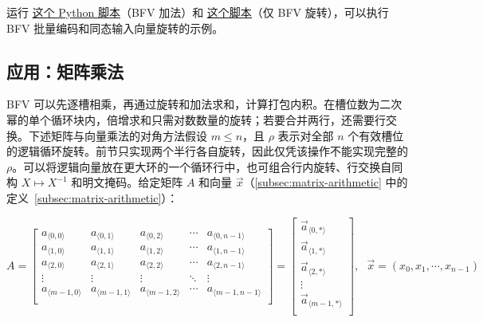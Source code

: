  运行 \href{https://github.com/wang2000star/fhe-textbook-cn/blob/chinese-edition/source%20code/bfv.py}{\underline{这个 Python 脚本}}（BFV 加法）和 \href{https://github.com/wang2000star/fhe-textbook-cn/blob/chinese-edition/source%20code/bfv_rotation_only.py}{\underline{这个脚本}}（仅 BFV 旋转），可以执行 BFV 批量编码和同态输入向量旋转的示例。



\subsection{应用：矩阵乘法}
\label{subsec:bfv-matrix-multiplication}

BFV 可以先逐槽相乘，再通过旋转和加法求和，计算打包内积。在槽位数为二次幂的单个循环块内，倍增求和只需对数数量的旋转；若要合并两行，还需要行交换。下述矩阵与向量乘法的对角方法假设 $m\leq n$，且 $\rho$ 表示对全部 $n$ 个有效槽位的逻辑循环旋转。前节只实现两个半行各自旋转，因此仅凭该操作不能实现完整的 $\rho$。可以将逻辑向量放在更大环的一个循环行中，也可组合行内旋转、行交换自同构 $X\mapsto X^{-1}$ 和明文掩码。给定矩阵 $A$ 和向量 $\vec x$（\autoref{subsec:matrix-arithmetic} 中的定义~\ref*{subsec:matrix-arithmetic}）：

$A = \begin{bmatrix}
 a_{\langle 0, 0\rangle} & a_{\langle 0, 1\rangle} & a_{\langle 0, 2\rangle} & \cdots & a_{\langle 0, n-1\rangle}\\
 a_{\langle 1, 0\rangle} & a_{\langle 1, 1\rangle} & a_{\langle 1, 2\rangle} & \cdots & a_{\langle 1, n-1\rangle} \\
 a_{\langle 2, 0\rangle} & a_{\langle 2, 1\rangle} & a_{\langle 2, 2\rangle} & \cdots & a_{\langle 2, n-1\rangle} \\
\vdots & \vdots & \vdots & \ddots & \vdots \\
 a_{\langle m-1, 0\rangle} & a_{\langle m-1, 1\rangle} & a_{\langle m-1, 2\rangle} & \cdots & a_{\langle m-1, n-1\rangle} \\
\end{bmatrix} = \begin{bmatrix} 
\vec{a}_{\langle 0, * \rangle} \\ 
\vec{a}_{\langle 1, * \rangle} \\ 
\vec{a}_{\langle 2, * \rangle} \\ 
\vdots\\
\vec{a}_{\langle m-1, * \rangle} \\ 
\end{bmatrix}, \text{ } \vec{x} = (x_0, x_1, \cdots, x_{n-1})$


